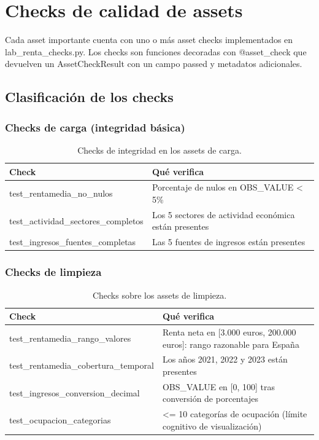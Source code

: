\documentclass[spanish,a4paper,12pt,oneside]{extreport}
\begin{document}
\chapter{Checks de calidad de assets}

Cada asset importante cuenta con uno o más asset checks implementados en lab\_renta\_checks.py. Los checks son funciones decoradas con @asset\_check que devuelven un AssetCheckResult con un campo passed y metadatos adicionales.

\section{Clasificación de los checks}

\subsection{Checks de carga (integridad básica)}

\begin{table}[H]
\centering
\small
\begin{tabular}{lp{8cm}}
\toprule
Check & Qué verifica \\
\midrule
test\_rentamedia\_no\_nulos & Porcentaje de nulos en OBS\_VALUE < 5\% \\
test\_actividad\_sectores\_completos & Los 5 sectores de actividad económica están presentes \\
test\_ingresos\_fuentes\_completas & Las 5 fuentes de ingresos están presentes \\
\bottomrule
\end{tabular}
\caption{Checks de integridad en los assets de carga.}
\end{table}

\subsection{Checks de limpieza}

\begin{table}[H]
\centering
\small
\begin{tabular}{lp{8cm}}
\toprule
Check & Qué verifica \\
\midrule
test\_rentamedia\_rango\_valores & Renta neta en [3.000 euros, 200.000 euros]: rango razonable para España \\
test\_rentamedia\_cobertura\_temporal & Los años 2021, 2022 y 2023 están presentes \\
test\_ingresos\_conversion\_decimal & OBS\_VALUE en [0, 100] tras conversión de porcentajes \\
test\_ocupacion\_categorias & <= 10 categorías de ocupación (límite cognitivo de visualización) \\
\bottomrule
\end{tabular}
\caption{Checks sobre los assets de limpieza.}
\end{table}
\end{document}
